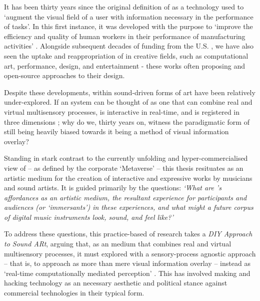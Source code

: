 \begin{SingleSpace}
    It has been thirty years since the original definition of  as a technology used to `augment the visual field of a user with information necessary in the performance of tasks'. In this first instance, it was developed with the purpose to `improve the efficiency and quality of human workers in their performance of manufacturing activities' \citep{caudell1992}. Alongside subsequent decades of funding from the U.S. , we have also seen the uptake and reappropriation of  in creative fields, such as computational art, performance, design, and entertainment - these works often proposing  and open-source approaches to their design. 

    Despite these developments,  within sound-driven forms of art have been relatively under-explored. If an  system can be thought of as one that can combine real and virtual multisensory processes, is interactive in real-time, and is registered in three dimensions \citep{azuma1997}; why do we, thirty years on, witness the paradigmatic form of  still being heavily biased \citep{billinghurst2015} towards it being a method of visual information overlay?
    
    Standing in stark contrast to the currently unfolding and hyper-commercialised view of  -- as defined by the corporate `Metaverse' -- this thesis resituates  as an artistic medium for the creation of interactive and expressive works by musicians and sound artists. It is guided primarily by the questions: \textit{`What are 's affordances as an artistic medium, the resultant experience for participants and audiences (or `immersants') in these experiences, and what might a future corpus of  digital music instruments look, sound, and feel like?'}
    
    To address these questions, this practice-based of research takes a \textit{DIY Approach to Sound ARt}, arguing that, as an medium that combines real and virtual multisensory processes, it must explored with a sensory-process agnostic approach -- that is, to approach  as more than mere visual information overlay -- instead as `real-time computationally mediated perception' \citep{chevalier2020}. This has involved making and hacking technology as an necessary aesthetic and political stance against commercial  technologies in their typical form.
    

\end{SingleSpace}
